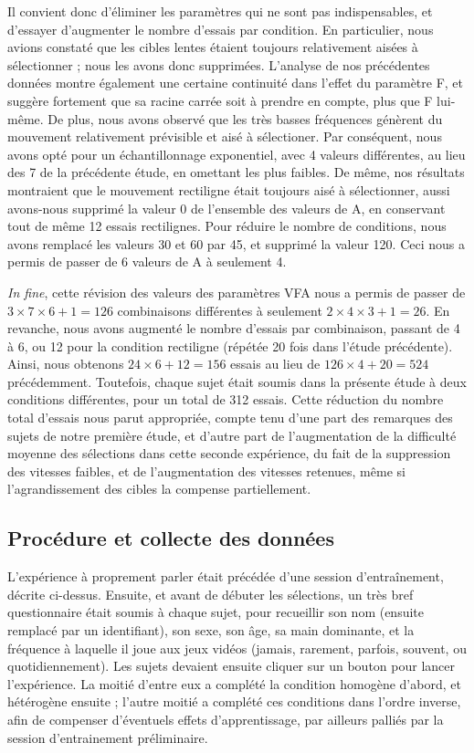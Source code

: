 	Il convient donc d'éliminer les paramètres qui ne sont pas indispensables, et d'essayer d'augmenter le nombre d'essais par condition. En particulier, nous avions constaté que les cibles lentes étaient toujours relativement aisées à sélectionner ; nous les avons donc supprimées. L'analyse de nos précédentes données montre également une certaine continuité dans l'effet du paramètre F, et suggère fortement que sa racine carrée soit à prendre en compte, plus que F lui-même. De plus, nous avons observé que les très basses fréquences génèrent du mouvement relativement prévisible et aisé à sélectioner. Par conséquent, nous avons opté pour un échantillonnage exponentiel, avec 4 valeurs différentes, au lieu des 7 de la précédente étude, en omettant les plus faibles. De même, nos résultats montraient que le mouvement rectiligne était toujours aisé à sélectionner, aussi avons-nous supprimé la valeur 0 de l'ensemble des valeurs de A, en conservant tout de même 12 essais rectilignes. Pour réduire le nombre de conditions, nous avons remplacé les valeurs 30\textdegree{} et 60\textdegree{} par 45\textdegree{}, et supprimé la valeur 120\textdegree{}. Ceci nous a permis de passer de 6 valeurs de A à seulement 4.
	
	\emph{In fine}, cette révision des valeurs des paramètres VFA nous a permis de passer de $3\times{}7\times{}6+1=126$ combinaisons différentes à seulement $2\times{}4\times{}3+1=26$. En revanche, nous avons augmenté le nombre d'essais par combinaison, passant de 4 à 6, ou 12 pour la condition rectiligne (répétée 20 fois dans l'étude précédente). Ainsi, nous obtenons $24\times{}6+12=156$ essais au lieu de $126\times{}4+20=524$ précédemment. Toutefois, chaque sujet était soumis dans la présente étude à deux conditions différentes, pour un total de 312 essais. Cette réduction du nombre total d'essais nous parut appropriée, compte tenu d'une part des remarques des sujets de notre première étude, et d'autre part de l'augmentation de la difficulté moyenne des sélections dans cette seconde expérience, du fait de la suppression des vitesses faibles, et de l'augmentation des vitesses retenues, même si l'agrandissement des cibles la compense partiellement.
	
	\subsection{Procédure et collecte des données}
	L'expérience à proprement parler était précédée d'une session d'entraînement, décrite ci-dessus. Ensuite, et avant de débuter les sélections, un très bref questionnaire était soumis à chaque sujet, pour recueillir son nom (ensuite remplacé par un identifiant), son sexe, son âge, sa main dominante, et la fréquence à laquelle il joue aux jeux vidéos (jamais, rarement, parfois, souvent, ou quotidiennement). Les sujets devaient ensuite cliquer sur un bouton pour lancer l'expérience. La moitié d'entre eux a complété la condition homogène d'abord, et hétérogène ensuite ; l'autre moitié a complété ces conditions dans l'ordre inverse, afin de compenser d'éventuels effets d'apprentissage, par ailleurs palliés par la session d'entrainement préliminaire.
	
